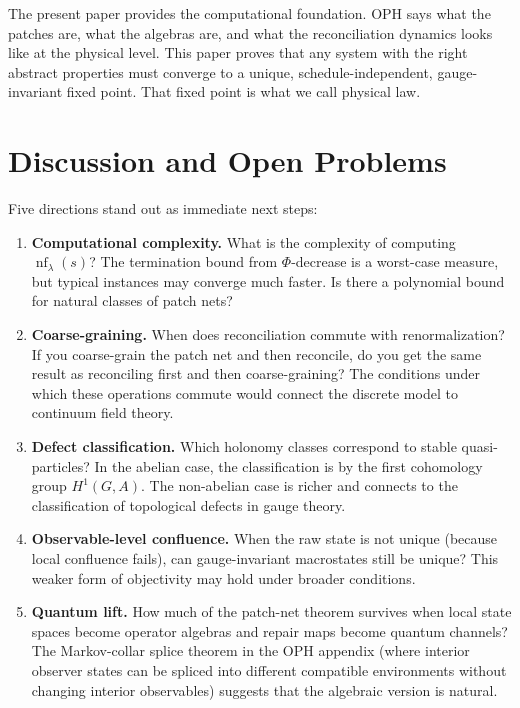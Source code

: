 \documentclass[11pt]{article}
\begin{document}
The present paper provides the computational foundation. OPH says what the patches are, what the algebras are, and what the reconciliation dynamics looks like at the physical level. This paper proves that any system with the right abstract properties must converge to a unique, schedule-independent, gauge-invariant fixed point. That fixed point is what we call physical law.


\section{Discussion and Open Problems}

Five directions stand out as immediate next steps:

\begin{enumerate}
\item \textbf{Computational complexity.} What is the complexity of computing $\operatorname{nf}_\lambda(s)$? The termination bound from $\Phi$-decrease is a worst-case measure, but typical instances may converge much faster. Is there a polynomial bound for natural classes of patch nets?

\item \textbf{Coarse-graining.} When does reconciliation commute with renormalization? If you coarse-grain the patch net and then reconcile, do you get the same result as reconciling first and then coarse-graining? The conditions under which these operations commute would connect the discrete model to continuum field theory.

\item \textbf{Defect classification.} Which holonomy classes correspond to stable quasi-particles? In the abelian case, the classification is by the first cohomology group $H^1(G,A)$. The non-abelian case is richer and connects to the classification of topological defects in gauge theory.

\item \textbf{Observable-level confluence.} When the raw state is not unique (because local confluence fails), can gauge-invariant macrostates still be unique? This weaker form of objectivity may hold under broader conditions.

\item \textbf{Quantum lift.} How much of the patch-net theorem survives when local state spaces become operator algebras and repair maps become quantum channels? The Markov-collar splice theorem in the OPH appendix (where interior observer states can be spliced into different compatible environments without changing interior observables) suggests that the algebraic version is natural.
\end{enumerate}
\end{document}
